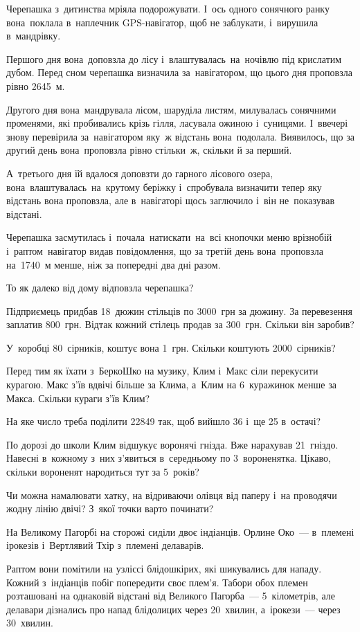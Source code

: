 \problem
Черепашка з~дитинства мріяла подорожувати. І~ось одного сонячного ранку
вона поклала в~наплечник GPS-навігатор, щоб не заблукати,
і~вирушила в~мандрівку.

Першого дня вона доповзла до лісу і~влаштувалась на ночівлю під крислатим
дубом. Перед сном черепашка визначила за навігатором, що цього дня
проповзла рівно 2645~м.

Другого дня вона мандрувала лісом, шаруділа листям, милувалась сонячними
променями, які пробивались крізь гілля, ласувала ожиною і~суницями.
І~ввечері знову перевірила за навігатором яку~ж відстань вона подолала.
Виявилось, що за другий день вона проповзла рівно стільки~ж,
скільки й за перший.

А~третього дня їй вдалося доповзти до гарного лісового озера,
вона влаштувалась на крутому беріжку і~спробувала визначити тепер
яку відстань вона проповзла, але в~навігаторі щось заглючило
і~він не~показував відстані.

Черепашка засмутилась і~почала натискати на всі кнопочки меню врізнобій
і~раптом навігатор видав повідомлення, що за третій день вона проповзла
на 1740~м менше, ніж за попередні два дні разом.

То як далеко від дому відповзла черепашка?


\problem
Підприємець придбав 18~дюжин стільців по 3000~грн за дюжину.
За перевезення заплатив 800~грн.
Відтак кожний стілець продав за 300~грн.
Скільки він заробив?


\problem
У~коробці 80~сірників, коштує вона 1~грн.
Скільки коштують 2000~сірників?


\problem
Перед тим як їхати з~БеркоШко на музику, Клим і~Макс сіли перекусити курагою.
Макс з’їв вдвічі більше за Клима, а~Клим на 6~куражинок менше за Макса.
Скільки кураги з’їв Клим?


\problem
На яке число треба поділити 22849 так, щоб вийшло 36 і~ще 25 в~остачі?


\problem
По дорозі до школи Клим відшукує воронячі гнізда. Вже нарахував 21~гніздо.
Навесні в~кожному з~них з’явиться в~середньому по 3~вороненятка.
Цікаво, скільки вороненят народиться тут за 5~років?


\problem
Чи можна намалювати хатку, на відриваючи олівця від паперу і~на проводячи
жодну лінію двічі?
З~якої точки варто починати?


\problem
На Великому Пагорбі на сторожі сиділи двоє індіанців.
Орлине Око~--- в~племені ірокезів і~Вертлявий Тхір з~племені делаварів.

Раптом вони помітили на узліссі блідошкірих, які шикувались для нападу.
Кожний з~індіанців побіг попередити своє плем’я.
Табори обох племен розташовані на однаковій відстані від Великого Пагорба~---
5~кілометрів, але делавари дізнались про напад блідолицих через 20~хвилин,
а~ірокези~--- через 30~хвилин.

